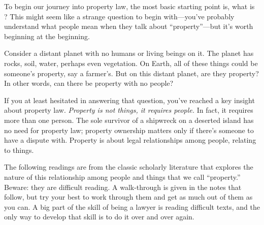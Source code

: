 To begin our journey into property law, the most basic starting point is, what
is ? This might seem like a strange question to begin
with---you've probably understand what people mean when they talk about
``property''---but it's worth beginning at the beginning.

Consider a distant planet with no humans or living beings on it. The planet has
rocks, soil, water, perhaps even vegetation. On Earth, all of these things could
be someone's property, say a farmer's. But on this distant planet, are they
property? In other words, can there be property with no people?

If you at least hesitated in answering that question, you've reached a key
insight about property law. \emph{Property is not things, it requires people.}
In fact, it requires more than one person. The sole survivor of a shipwreck on a
deserted island has no need for property law; property ownership matters only if
there's someone to have a dispute with.
Property is about legal relationships among people, relating to things.

The following readings are from the classic scholarly literature that
explores the nature of this relationship among people and things
that we call ``property.'' Beware: they are difficult reading. A walk-through is
given in the notes that follow, but try your best to work through them and get
as much out of them as you can. A big part of the skill of being a lawyer is
reading difficult texts, and the only way to develop that skill is to do it over
and over again.

